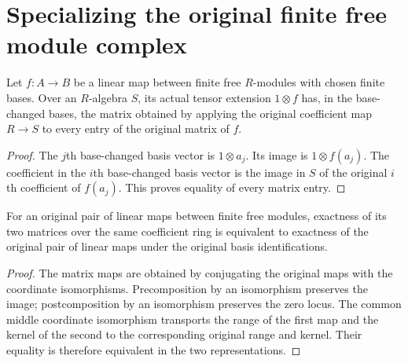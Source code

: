 \section{Specializing the original finite free module complex}

\begin{lemma}
\label{lem:kn-specialization-original-base-change-matrix}
\leanok
Let $f:A\to B$ be a linear map between finite free $R$-modules with
chosen finite bases.  Over an $R$-algebra $S$, its actual tensor
extension $1\otimes f$ has, in the base-changed bases, the matrix
obtained by applying the original coefficient map $R\to S$ to every
entry of the original matrix of $f$.
\end{lemma}
\begin{proof}
The $j$th base-changed basis vector is $1\otimes a_j$.  Its image
is $1\otimes f(a_j)$.  The coefficient in the $i$th base-changed
basis vector is the image in $S$ of the original $i$th coefficient
of $f(a_j)$.  This proves equality of every matrix entry.
\end{proof}

\begin{lemma}
\label{lem:kn-specialization-original-exactness-matrix}
\leanok
For an original pair of linear maps between finite free modules,
exactness of its two matrices over the same coefficient ring is equivalent to exactness
of the original pair of linear maps under the original basis
identifications.
\end{lemma}
\begin{proof}
The matrix maps are obtained by conjugating the original maps with
the coordinate isomorphisms.  Precomposition by an isomorphism
preserves the image; postcomposition by an isomorphism preserves
the zero locus.  The common middle coordinate isomorphism transports
the range of the first map and the kernel of the second to the
corresponding original range and kernel.  Their equality is therefore
equivalent in the two representations.
\end{proof}


